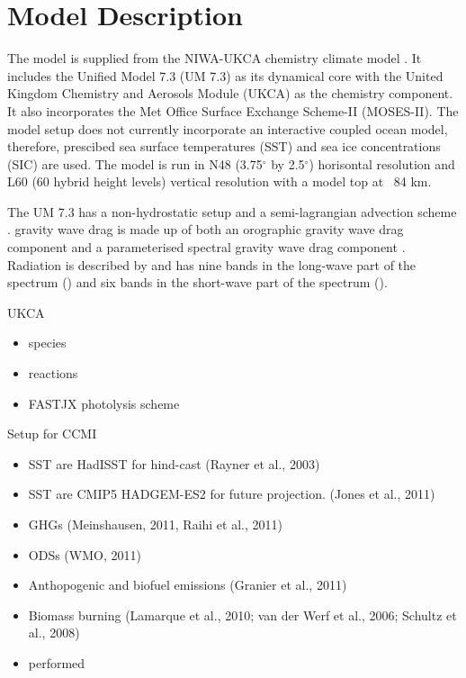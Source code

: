\section{Model Description}

The model is supplied from the NIWA-UKCA chemistry climate model \citep{Morgenstern:2009bu}. It includes the Unified Model 7.3 (UM 7.3) as its dynamical core with the United Kingdom Chemistry and Aerosols Module (UKCA) as the chemistry component. It also incorporates the Met Office Surface Exchange Scheme-II (MOSES-II). The model setup does not currently incorporate an interactive coupled ocean model, therefore, prescibed sea surface temperatures (SST) and sea ice concentrations (SIC) are used. The model is run in N48 (3.75$^\circ$ by 2.5$^\circ$) horisontal resolution and L60 (60 hybrid height levels) vertical resolution with a model top at ~84 km.

The UM 7.3 has a non-hydrostatic setup \citep{Davies:2005vu} and a semi-lagrangian advection scheme \citep{Priestley:1993ur}. gravity wave drag is made up of both an orographic gravity wave drag component \citep{Webster:2003vf} and a parameterised spectral gravity wave drag component \citep{Scaife:2002vt}. Radiation is described by \cite{Edwards:1996wo} and has nine bands in the long-wave part of the spectrum () and six bands in the short-wave part of the spectrum ().

UKCA
\begin{itemize}
\item species
\item reactions
\item FASTJX photolysis scheme
\end{itemize}


Setup for CCMI

\begin{itemize}
The model runs evaluated in this paper are also a part of CCMI. This includes a CCMI hind-cast run, labelled REF-C1 from 1960-2010. The historical part of a future projection run, labelled REF-C2 from 1960-2010. For the REF-C1 run, SST and SIC are from the Hadley Centre HaDISST dataset \citep{Rayner:2003ty}. GHGs are from \citep{Meinshausen:2011is} \citep{Riahi:2011dk} and follow RCP 8.5 after 2005. ODSs follow the A1B scenario from \citep{WMO:2011vf}. Anthropogenic and biofuel emmisions follow \citep{Granier:2011dw}. Biomass burning emissions follow \citep{Lamarque:2011wr} \citep{vanderWerf:2006gi} \citep{Schultz:2008wf}. The future proection run
\item SST are HadISST for hind-cast (Rayner et al., 2003)
\item SST are CMIP5 HADGEM-ES2 for future projection. (Jones et al., 2011)
\item GHGs (Meinshausen, 2011, Raihi et al., 2011)
\item ODSs (WMO, 2011)
\item Anthopogenic and biofuel emissions (Granier et al., 2011)
\item Biomass burning (Lamarque et al., 2010; van der Werf et al., 2006; Schultz et al., 2008)
\item performed
\end{itemize}



